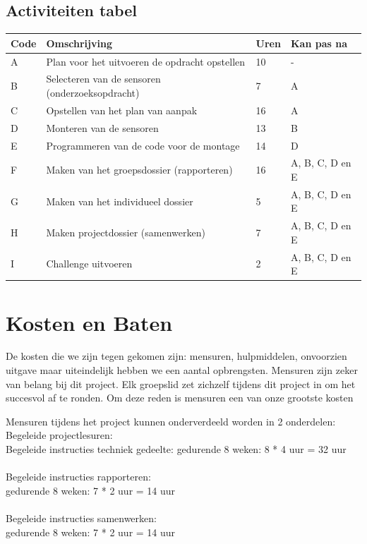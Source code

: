 \documentclass[oneside]{book}
\begin{document}
{\section*{Activiteiten tabel}
\begin{tabular}{ | l | l | l | l | }
\hline
	Code & Omschrijving & Uren  & Kan pas na \\ \hline
	A & Plan voor het uitvoeren de opdracht opstellen & 10 & - \\ \hline
	B & Selecteren van de sensoren (onderzoeksopdracht) & 7 & A \\ \hline
	C & Opstellen van het plan van aanpak & 16 & A \\ \hline
	D & Monteren van de sensoren & 13 & B \\ \hline
	E & Programmeren van de code voor de montage & 14 & D \\ \hline
	F & Maken van het groepsdossier (rapporteren) & 16 & A, B, C, D en E \\ \hline
	G & Maken van het individueel dossier & 5 & A, B, C, D en E \\ \hline
	H & Maken projectdossier (samenwerken) & 7 & A, B, C, D en E \\ \hline
	I & Challenge uitvoeren & 2 & A, B, C, D en E \\ \hline
\end{tabular}

}
\clearpage
\chapter{Kosten en Baten}
{\color{red}De kosten die we zijn tegen gekomen zijn: mensuren, hulpmiddelen, onvoorzien uitgave maar uiteindelijk hebben we een aantal opbrengsten.
Mensuren zijn zeker van belang bij dit project. Elk groepslid zet zichzelf tijdens dit project in om het succesvol af te ronden. Om deze reden is mensuren een van onze grootste kosten\\}

{\color{red} Mensuren tijdens het project kunnen onderverdeeld worden in 2 onderdelen:}\\

Begeleide projectlesuren: \\
{\color{red}Begeleide instructies techniek gedeelte: }
gedurende 8 weken:  8 * 4  uur  =  32 uur\\
\\
{\color{red}Begeleide instructies rapporteren: }\\
gedurende 8 weken: 7 * 2  uur   =  14 uur\\
\\
Begeleide instructies samenwerken:\\
gedurende 8 weken: 7 * 2  uur  =  14  uur\\
                                                      
\end{document}

